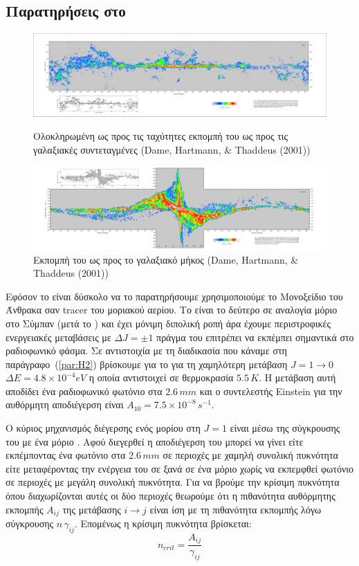\documentclass[a4paper,12pt]{memoir}
\begin{document}
\subsection{Παρατηρήσεις στο  }
\label{par:criticaldensity}
\begin{figure}[h!]
	\centering
	\includegraphics[width=17cm]{images/CO_long_lat.pdf}
	\caption{Ολοκληρωμένη ως προς τις ταχύτητες εκπομπή του  ως προς τις γαλαξιακές συντεταγμένες (Dame, Hartmann, \& Thaddeus (2001))}
	
		\centering
		\includegraphics[width=17cm]{images/CO_long_vel.pdf}
		\caption{Εκπομπή του  ως προς το γαλαξιακό μήκος (Dame, Hartmann, \& Thaddeus (2001))}
\end{figure}

Εφόσον το  είναι δύσκολο να το παρατηρήσουμε χρησιμοποιούμε το Μονοξείδιο του Άνθρακα  σαν tracer  του μοριακού αερίου. Το  είναι το δεύτερο σε αναλογία μόριο στο Σύμπαν (μετά το ) και έχει μόνιμη διπολική ροπή άρα έχουμε περιστροφικές ενεργειακές μεταβάσεις με $\Delta J=\pm 1$ πράγμα του επιτρέπει να εκπέμπει σημαντικά στο ραδιοφωνικό φάσμα. 
Σε αντιστοιχία με τη διαδικασία που κάναμε στη παράγραφο~(\ref{par:H2}) βρίσκουμε για το  για τη χαμηλότερη μετάβαση $J=1\rightarrow 0$ $\Delta E=4.8\times 10^{-4} eV$ η οποία αντιστοιχεί σε θερμοκρασία $5.5 \, K$. Η μετάβαση αυτή αποδίδει ένα ραδιοφωνικό φωτόνιο στα $2.6 \, mm$ και ο συντελεστής Einstein για την αυθόρμητη αποδιέγερση είναι $A_{10}=7.5\times 10^{-8} \, s^{-1}$.

Ο κύριος μηχανισμός διέγερσης ενός μορίου  στη $J=1$ είναι μέσω της σύγκρουσης του με ένα μόριο . Αφού διεγερθεί η αποδιέγερση του μπορεί να γίνει είτε εκπέμποντας ένα φωτόνιο στα $2.6 \, mm$ σε περιοχές με χαμηλή συνολική πυκνότητα είτε μεταφέροντας την ενέργεια του σε ξανά σε ένα μόριο  χωρίς να εκπεμφθεί φωτόνιο σε περιοχές με μεγάλη συνολική πυκνότητα. Για να βρούμε την κρίσιμη πυκνότητα όπου διαχωρίζονται αυτές οι δύο περιοχές θεωρούμε ότι η πιθανότητα αυθόρμητης εκπομπής $A_{ij}$ της μετάβασης $i\rightarrow j$ είναι ίση με τη πιθανότητα εκπομπής λόγω σύγκρουσης $n \, \gamma _{ij}$. Επομένως η κρίσιμη πυκνότητα βρίσκεται:
\begin{equation}
n_{crit}=\frac{A_{ij}}{\gamma _{ij}}
\end{equation} 
\end{document}
